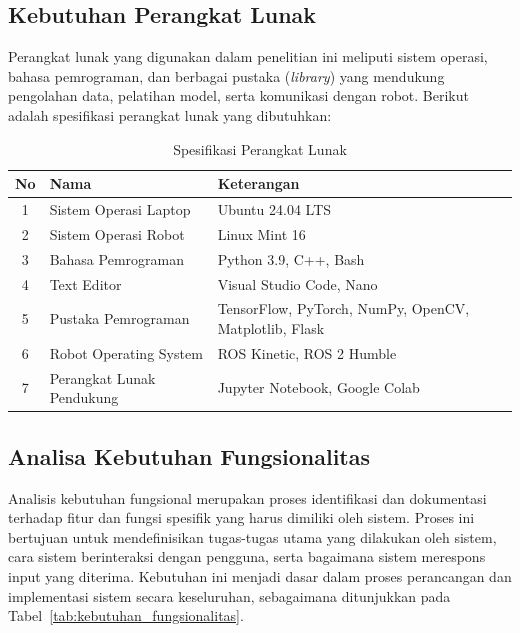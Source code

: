 \subsection{Kebutuhan Perangkat Lunak}
Perangkat lunak yang digunakan dalam penelitian ini meliputi sistem operasi, bahasa pemrograman, dan berbagai pustaka (\textit{library}) yang mendukung pengolahan data, pelatihan model, serta komunikasi dengan robot. Berikut adalah spesifikasi perangkat lunak yang dibutuhkan:

\begin{longtable}{|c|p{5cm}|p{8cm}|}
    \caption{Spesifikasi Perangkat Lunak}
    \label{tab:kebutuhan_perangkat_lunak} \\
    \hline
    \textbf{No} & \textbf{Nama} & \textbf{Keterangan} \\
    \hline
    \endfirsthead
    
    \endhead
    
    \hline
    \endfoot
    
    \hline
    \endlastfoot
    
    1 & Sistem Operasi Laptop & Ubuntu 24.04 LTS \\ \hline
    2 & Sistem Operasi Robot & Linux Mint 16 \\ \hline
    3 & Bahasa Pemrograman & Python 3.9, C++, Bash \\ \hline
    4 & Text Editor & Visual Studio Code, Nano \\ \hline
    5 & Pustaka Pemrograman & TensorFlow, PyTorch, NumPy, OpenCV, Matplotlib, Flask \\ \hline
    6 & Robot Operating System & ROS Kinetic, ROS 2 Humble \\ \hline
    7 & Perangkat Lunak Pendukung & Jupyter Notebook, Google Colab \\ \hline
    
\end{longtable}
    

\subsection{Analisa Kebutuhan Fungsionalitas}

Analisis kebutuhan fungsional merupakan proses identifikasi dan dokumentasi terhadap fitur dan fungsi spesifik yang harus dimiliki oleh sistem. Proses ini bertujuan untuk mendefinisikan tugas-tugas utama yang dilakukan oleh sistem, cara sistem berinteraksi dengan pengguna, serta bagaimana sistem merespons input yang diterima. Kebutuhan ini menjadi dasar dalam proses perancangan dan implementasi sistem secara keseluruhan, sebagaimana ditunjukkan pada Tabel~\ref{tab:kebutuhan_fungsionalitas}.

